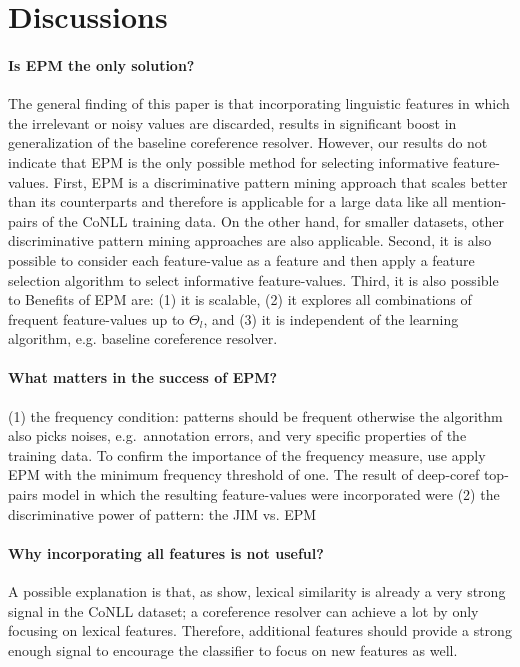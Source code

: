 \section{Discussions}
\paragraph{Is EPM the only solution?}
The general finding of this paper is that incorporating linguistic features in which the irrelevant or noisy values are discarded,
results in significant boost in generalization of the baseline coreference resolver.
However, our results do not indicate that EPM is the only possible method for selecting informative feature-values.
First, EPM is a discriminative pattern mining approach that scales better than its counterparts
and therefore is applicable for a large data like all mention-pairs of the CoNLL training data.
On the other hand, for smaller datasets, other discriminative pattern mining approaches are also applicable.
Second, it is also possible to consider each feature-value as a feature and then apply a 
feature selection algorithm to select informative feature-values.
Third, it is also possible to 
Benefits of EPM are: (1) it is scalable, (2) it explores all combinations of frequent feature-values up to $\Theta_l$,
and (3) it is independent of the learning algorithm, e.g. baseline coreference resolver.

\paragraph{What matters in the success of EPM?} 
(1) the frequency condition: patterns should be frequent otherwise the algorithm also picks noises, e.g.\ annotation errors, and very specific properties of the training data. To confirm the importance of the frequency measure, use apply EPM with the minimum frequency threshold of one. The result of deep-coref top-pairs model in which the resulting feature-values were incorporated were    
(2) the discriminative power of pattern: the JIM vs. EPM 

\paragraph{Why incorporating all features is not useful?}
A possible explanation is that, as  show, 
lexical similarity is already a very strong signal in the CoNLL dataset;
a coreference resolver can achieve a lot by only focusing on lexical features.
Therefore, additional features should provide a strong enough signal to 
encourage the classifier to focus on new features as well.



 
